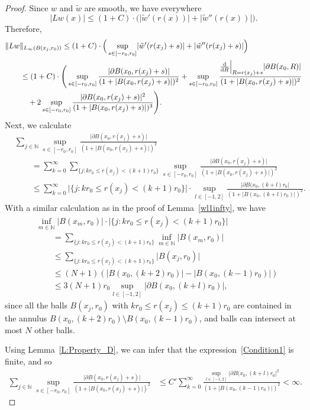 \documentclass[pdftex]{sigma}
\numberwithin{equation}{section}
\newcommand{\norm}[1]{\lVert#1\rVert}
\newcommand{\abs}[1]{\lvert#1\rvert}
\begin{document}
\begin{proof}
Since $w$ and $\tilde{w}$ are smooth, we have everywhere
\[
\abs{Lw(x)} \leq (1+C)\cdot\big(\big|\tilde{w}'(r(x))\big| + \big|\tilde{w}''(r(x))\big|\big).
\]
 Therefore,
\begin{align*}
 &\norm{Lw}_{L_\infty(B(x_j, r_0))} \leq (1+C)\cdot \Big(\sup_{s \in [-r_0, r_0]} \abs{\tilde{w}'(r(x_j)+s)} + \abs{\tilde{w}''(r(x_j)+s)} \Big)\\
 &\qquad{}\leq (1+C)\cdot \Bigg(\sup_{s \in [-r_0, r_0]} \frac{\abs{\partial B(x_0, r(x_j)+s)}}{(1+\abs{B(x_0,r(x_j)+s)})^2} + \sup_{s \in [-r_0, r_0]} \frac{\frac{{\rm d}}{{\rm d}R}\Big|_{R= r(x_j)+s}\abs{\partial B(x_0, R)}}{(1+\abs{B(x_0,r(x_j)+s)})^2} \\
 &\qquad\quad{} + 2 \sup_{s \in [-r_0, r_0]} \frac{\abs{\partial B(x_0, r(x_j)+s)}^2}{(1+\abs{B(x_0,r(x_j)+s)})^3}\Bigg).
\end{align*}
Next, we calculate
\begin{align*}
 &\sum_{j\in \mathbb{N}} \sup_{s \in [-r_0, r_0]} \frac{\abs{\partial B(x_0, r(x_j)+s)}}{(1+\abs{B(x_0,r(x_j)+s)})^2}\\
 &\qquad {}= \sum_{k=0}^\infty \sum_{\{j\colon kr_0 \leq r(x_j)< (k+1)r_0\}} \sup_{s \in [-r_0, r_0]} \frac{\abs{\partial B(x_0, r(x_j)+s)}}{(1+\abs{B(x_0,r(x_j)+s)})^2}\\
 &\qquad {}\leq \sum_{k=0}^\infty \abs{\{j\colon k r_0 \leq r(x_j)< (k+1)r_0\}}\cdot \sup_{l \in [-1, 2]} \frac{\abs{\partial B(x_0, (k+l)r_0}}{(1+\abs{B(x_0,(k+l)r_0)})^2}.
\end{align*}
With a similar calculation as in the proof of Lemma~\ref{wl1infty}, we have
\begin{align*}
 &\inf_{m \in \mathbb{N}} \abs{B(x_m, r_0)} \cdot \abs{\{j: k r_0 \leq r(x_j)< (k+1)r_0\}} \\
 &\qquad {}= \sum_{\{j : k r_0 \leq r(x_j)< (k+1)r_0\}} \inf_{m \in \mathbb{N}}\abs{B(x_m, r_0)}\\
 &\qquad {}\leq \sum_{\{j : k r_0 \leq r(x_j)< (k+1)r_0\}} \abs{B(x_j, r_0)}\\
 &\qquad {}\leq (N+1) (\abs{B(x_0, (k+2)r_0)} - \abs{B(x_0, (k-1)r_0)})\\
 &\qquad {}\leq 3(N+1)r_0 \sup_{l\in [-1,2]} \abs{\partial B(x_0, (k+l)r_0)},
\end{align*}
since all the balls $B(x_j, r_0)$ with $kr_0 \leq r(x_j)\leq (k+1)r_0$ are contained in the annulus $B(x_0, (k+2)r_0)\setminus B(x_0, (k-1)r_0)$, and balls can intersect at most $N$ other balls.

Using Lemma~\ref{L:Property_D}, we can infer that the expression~\eqref{Condition1} is finite, and so
\begin{align*}
 \sum_{j\in \mathbb{N}} \sup_{s \in [-r_0, r_0]} \frac{\abs{\partial B(x_0, r(x_j)+s)}}{(1+\abs{B(x_0,r(x_j)+s)})^2} &\leq C' \sum_{k=0}^\infty \frac{\sup_{l \in [-1, 2]}\abs{\partial B(x_0, (k+l)r_0}^2}{(1+\abs{B(x_0,(k-1)r_0)})^2} < \infty.
\end{align*}


\end{proof}
\end{document}
